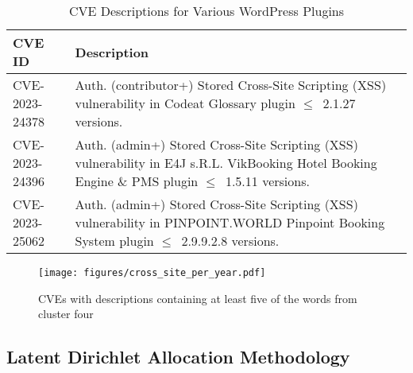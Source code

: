 \begin{table}[h]
	\begin{center}
		\begin{tabular}{|p{}|p{}|}
			\hline
			\textbf{CVE ID} & \textbf{Description}                                                                                                                               \\
			\hline

			CVE-2023-24378  & Auth. (contributor+) Stored Cross-Site Scripting (XSS) vulnerability in Codeat Glossary plugin $\leq$~2.1.27 versions.                             \\

			\hline

			CVE-2023-24396  & Auth. (admin+) Stored Cross-Site Scripting (XSS) vulnerability in E4J s.R.L. VikBooking Hotel Booking Engine \& PMS plugin $\leq$~1.5.11 versions. \\

			\hline

			CVE-2023-25062  & Auth. (admin+) Stored Cross-Site Scripting (XSS) vulnerability in PINPOINT.WORLD Pinpoint Booking System plugin $\leq$~2.9.9.2.8 versions.         \\

			\hline
		\end{tabular}

	\end{center}
	\caption{CVE Descriptions for Various WordPress Plugins}
	\label{tab:cve-descriptions}
\end{table}


\begin{figure}[t]
	\begin{center}

		\texttt{[image: figures/cross\_site\_per\_year.pdf]}
	\end{center}

	\caption{\label{fig:cross_site_per_year}CVEs with descriptions containing at least five of the words from cluster four}
\end{figure}


\subsection{Latent Dirichlet Allocation Methodology}

